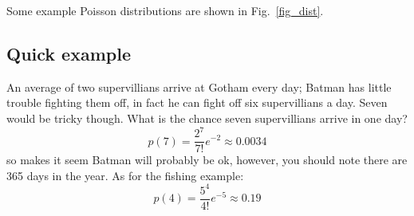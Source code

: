 \documentclass[11pt,a4paper]{scrartcl}
\begin{document}
Some example Poisson distributions are shown in Fig.~\ref{fig_dist}.

\subsection*{Quick example}

An average of two supervillians arrive at Gotham every day; Batman has
little trouble fighting them off, in fact he can fight off six
supervillians a day. Seven would be tricky though. What is the chance
seven supervillians arrive in one day?
\begin{equation}
p(7)=\frac{2^7}{7!}e^{-2}\approx 0.0034
\end{equation}
so makes it seem Batman will probably be ok, however, you should note
there are 365 days in the year. As for the fishing example:
\begin{equation}
p(4)=\frac{5^4}{4!}e^{-5}\approx 0.19
\end{equation}



\end{document}
